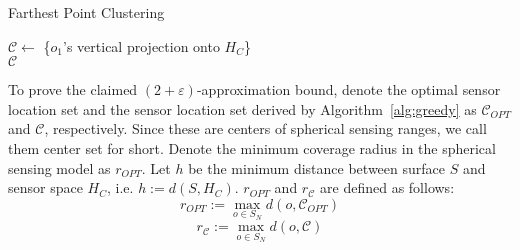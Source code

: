 \begin{algorithm}
\begin{small}
    \caption{Farthest Point Clustering}
		\label{alg:greedy}
    \SetAlgoLined
		\vspace{1mm}
		\vspace{1mm}
        $\mathcal{C} \leftarrow$  \{$o_1$'s vertical projection onto $H_C$\}\\
        \Return $\mathcal{C}$
\end{small}
\end{algorithm}

To prove the claimed $(2+\varepsilon)$-approximation bound,  
denote the optimal sensor location set and the sensor location set derived by Algorithm~\ref{alg:greedy} as $\mathcal{C}_{OPT}$ and $\mathcal{C}$, respectively. Since these are centers of spherical sensing ranges, we call them center set for short. Denote the minimum coverage radius in the spherical sensing model as $r_{OPT}$. Let $h$ be the minimum distance between surface $S$ and sensor space $H_C$, i.e. $h:=d(S,H_C)$. $r_{OPT}$ and $r_{\mathcal{C}}$ are defined as follows:
\begin{equation}
    r_{OPT}:=\max_{o\in S_N} d(o, \mathcal{C}_{OPT})
\end{equation}
\begin{equation}
    r_{\mathcal{C}}:=\max_{o\in S_N} d(o, \mathcal{\mathcal{C}})
\end{equation}

